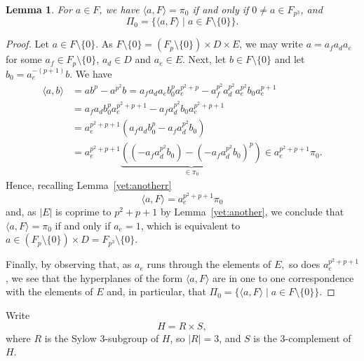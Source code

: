 \documentclass{amsart}
\newtheorem{lemma}[theorem]{Lemma}
\begin{document}
\begin{lemma}\label{lemma:te1}
For $a \in F$, we have $\langle a, F \rangle = \pi_0$ if and only if $0 \neq a \in F_{p^3}$, and
 $$\Pi_0 = \{\langle a,F\rangle\mid a\in F\setminus\{0\}\}.$$
\end{lemma}
\begin{proof}
Let $a\in F\setminus\{0\}$. As $F\setminus\{0\}=(F_p\setminus\{0\})\times D\times E$, we may write $a=a_f a_da_e$ for some $a_f\in F_p\setminus\{0\}$, $a_d\in D$ and $a_e\in E$.
Next, let $b\in F\setminus\{0\}$ and let $b_0=a_e^{-(p+1)}b$. We have
\begin{align*}
\langle a,b\rangle&=
ab^p-a^{p^2}b=
a_fa_da_eb_0^pa_e^{p^2+p}-a_f^{p^2}a_d^{p^2}a_e^{p^2}b_0a_e^{p+1}\\
&=a_fa_db_0^pa_e^{p^2+p+1}-a_fa_d^{p^2}b_0a_e^{p^2+p+1}\\
&=a_e^{p^2+p+1}\left(a_fa_db_0^p-a_fa_d^{p^2}b_0\right)\\
&=a_e^{p^2+p+1}\underbrace{\left((-a_fa_d^{p^2}b_0)-(-a_fa_d^{p^2}b_0)^p\right)}_{\in \pi_0}\in a_e^{p^2+p+1}\pi_0.
\end{align*}
Hence, recalling Lemma~\ref{yet:anotherr}
$$\langle a , F \rangle = a_e^{p^2+p+1}\pi_0$$
and, as $|E|$ is coprime to $p^2 + p +1$ by Lemma~\ref{yet:another}, we conclude that $\langle a, F \rangle = \pi_0$
if and only if $a_e = 1$, which is equivalent to $a \in (F_p\setminus\{0\})\times D = F_{p^3}\setminus\{0\}$.  

Finally, by observing that, as $a_e$ runs through the elements of $E,$  so does $a_e^{p^2+p+1}$, we 
see  that the hyperplanes of the form $\langle a,F\rangle$ are in one to one correspondence with the elements of $E$ and,
in particular, that $\Pi_0 = \{\langle a,F\rangle\mid a\in F\setminus\{0\}\}$.
\end{proof}

\smallskip
Write $$H = R \times S,$$ where $R$ is the Sylow $3$-subgroup of $H$,  so $|R| = 3$, and
$S$ is the $3$-complement of $H$.
\end{document}
